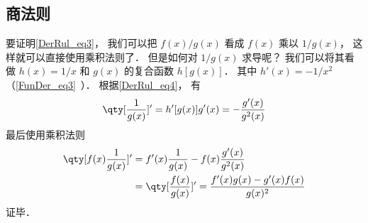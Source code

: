 \subsection{商法则}
要证明\autoref{DerRul_eq3}， 我们可以把 $f(x)/g(x)$ 看成 $f(x)$ 乘以 $1/g(x)$， 这样就可以直接使用乘积法则了． 但是如何对 $1/g(x)$ 求导呢？ 我们可以将其看做 $h(x) = 1/x$ 和 $g(x)$ 的复合函数 $h[g(x)]$． 其中 $h'(x) = -1/x^2$（\autoref{FunDer_eq3}~）． 根据\autoref{DerRul_eq4}， 有
\begin{equation}
\qty[\frac{1}{g(x)}]' = h'[g(x)]g'(x) = -\frac{g'(x)}{g^2(x)}
\end{equation}
最后使用乘积法则
\begin{equation}
\begin{aligned}
\qty[f(x) \frac{1}{g(x)}]' &= f'(x) \frac{1}{g(x)} - f(x) \frac{g'(x)}{g^2(x)}\\
&= \qty[ \frac{f(x)}{g(x)} ]'  = \frac{f'(x)g(x) - g'(x)f(x)}{g(x)^2}
\end{aligned}
\end{equation}
证毕．

